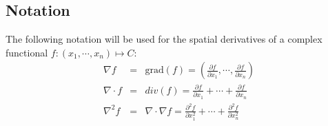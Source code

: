 \documentclass[a4paper,11pt]{article}
\begin{document}
\newpage

\begin{appendices}
\section{Notation}

The following notation will be used for the spatial derivatives of a complex functional
$f:(x_1,\cdots, x_n)\mapsto C$:
\begin{eqnarray}
\nabla f &=& \mbox{grad}(f) =
\left( \frac{\partial f}{\partial x_1}, \cdots, \frac{\partial f}{\partial x_n} \right) \\
\nabla \cdot f &=& div(f) = \frac{\partial f}{\partial x_1} + \cdots + \frac{\partial f}{\partial x_n} \\
\nabla^2 f &=& \nabla \cdot \nabla f =
    \frac{\partial^2 f}{\partial x_1^2} + \cdots + \frac{\partial^2 f}{\partial x_n^2}
\end{eqnarray}

\end{appendices}

%
%
\end{document}
